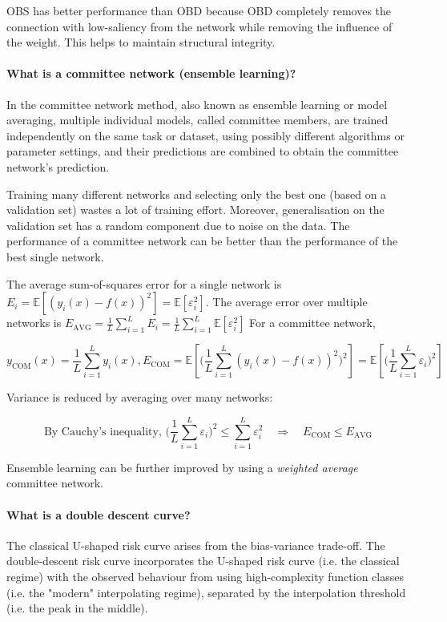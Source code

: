 OBS has better performance than OBD because OBD completely removes the connection with
low-saliency from the network while removing the influence of the weight. This helps to maintain
structural integrity.

\paragraph{What is a committee network (ensemble learning)?}

In the committee network method, also known as ensemble learning or model averaging,
multiple individual models, called committee members, are trained independently
on the same task or dataset, using possibly different algorithms or parameter settings,
and their predictions are combined to obtain the committee network's prediction.

Training many different networks and selecting only the best one (based on a validation set)
wastes a lot of training effort. Moreover,
generalisation on the validation set has a random component due to noise on the data.
The performance of a committee network can be better than the performance of the best single network.

The average sum-of-squares error for a single network is $E_i = \mathbb{E}[(y_i(x) - f(x))^2] = \mathbb{E}[\varepsilon_i^2]$.
The average error over multiple networks is $E_\text{AVG} = \frac{1}{L} \sum_{i=1}^L{E_i} = \frac{1}{L}\sum_{i=1}^L{\mathbb{E}[\varepsilon_i^2]}$
For a committee network,

$$
y_\text{COM}(x) = \frac{1}{L} \sum_{i=1}^L{y_i(x)},
E_\text{COM} = \mathbb{E}[ \big( \frac{1}{L} \sum_{i=1}^L{(y_i(x) - f(x))^2} \big)^2 ]
= \mathbb{E}[\big( \frac{1}{L} \sum_{i=1}^L{\varepsilon_i} \big)^2]
$$

Variance is reduced by averaging over many networks:

$$
\text{By Cauchy's inequality, }
\big( \frac{1}{L} \sum_{i=1}^L{\varepsilon_i} \big)^2
\leq
\sum_{i=1}^L{\varepsilon_i^2}
\quad \Rightarrow \quad
E_\text{COM} \leq E_\text{AVG}
$$

Ensemble learning can be further improved by using a \textit{weighted average} committee network.

\paragraph{What is a double descent curve?}

The classical U-shaped risk curve arises from the bias-variance trade-off.
The double-descent risk curve incorporates the U-shaped risk curve (i.e. the classical regime)
with the observed behaviour from using high-complexity function classes (i.e. the "modern" interpolating regime),
separated by the interpolation threshold (i.e. the peak in the middle).

